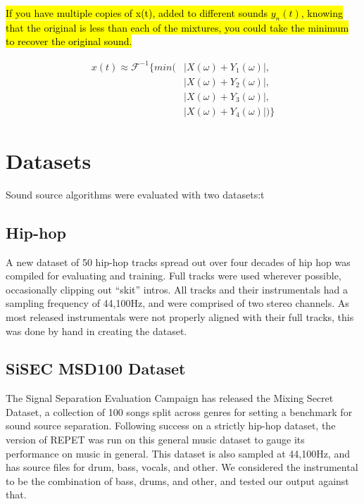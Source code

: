 \documentclass{article}
\begin{document}
\hl{If you have multiple copies of x(t), added to different sounds $y_n(t)$, knowing that the original is less than each of the mixtures, you could take the minimum to recover the original sound. }


\begin{equation}\label{Fourier}
\begin{split}
	x(t) \approx \mathcal{F}^{-1} \{min(& |X(\omega) + Y_1(\omega)|, \\
	&|X(\omega) + Y_2(\omega)|, \\
	&|X(\omega) + Y_3(\omega)|, \\
	&|X(\omega) + Y_4(\omega)| )\}
\end{split}
\end{equation}


\section{Datasets}
Sound source algorithms were evaluated with two datasets:t

\subsection{Hip-hop}
A new dataset of 50 hip-hop tracks spread out over four decades of hip hop was compiled for evaluating and training. Full tracks were used wherever possible, occasionally clipping out ``skit'' intros. All tracks and their instrumentals had a sampling frequency of 44,100Hz, and were comprised of two stereo channels. As most released instrumentals were not properly aligned with their full tracks, this was done by hand in creating the dataset.

\subsection{SiSEC MSD100 Dataset}
The Signal Separation Evaluation Campaign has released the Mixing Secret Dataset, a collection of 100 songs split across genres for setting a benchmark for sound source separation. Following success on a strictly hip-hop dataset, the version of REPET was run on this general music dataset to gauge its performance on music in general. This dataset is also sampled at 44,100Hz, and has source files for drum, bass, vocals, and other. We considered the instrumental to be the combination of bass, drums, and other, and tested our output against that.
\end{document}

